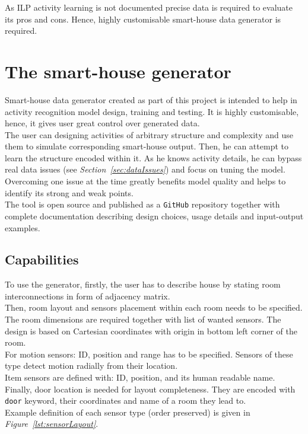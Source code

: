 \documentclass[10pt, a4paper, pdflatex, leqno, twoside, openright]{report}
\begin{document}
As ILP activity learning is not documented precise data is required to evaluate its pros and cons. Hence, highly customisable smart-house data generator is required.

  \section{The smart-house generator}
Smart-house data generator created as part of this project is intended to help in activity recognition model design, training and testing. It is highly customisable, hence, it gives user great control over generated data.\\

The user can designing activities of arbitrary structure and complexity and use them to simulate corresponding smart-house output. Then, he can attempt to learn the structure encoded within it. As he knows activity details, he can bypass real data issues (see \emph{Section~\ref{sec:dataIssues}}) and focus on tuning the model. Overcoming one issue at the time greatly benefits model quality and helps to identify its strong and weak points.\\

The tool is open source and published as a \texttt{GitHub} repository together with complete documentation describing design choices, usage details and input-output examples.

    \subsection{Capabilities}
To use the generator, firstly, the user has to describe house by stating room interconnections in form of adjacency matrix.\\

Then, room layout and sensors placement within each room needs to be specified. The room dimensions are required together with list of wanted sensors. The design is based on Cartesian coordinates with origin in bottom left corner of the room.\\
For motion sensors: ID, position and range has to be specified. Sensors of these type detect motion radially from their location.\\
Item sensors are defined with: ID, position, and its human readable name.\\
Finally, door location is needed for layout completeness. They are encoded with \texttt{door} keyword, their coordinates and name of a room they lead to.\\
Example definition of each sensor type (order preserved) is given in \emph{Figure~\ref{lst:sensorLayout}}.\\
\end{document}

